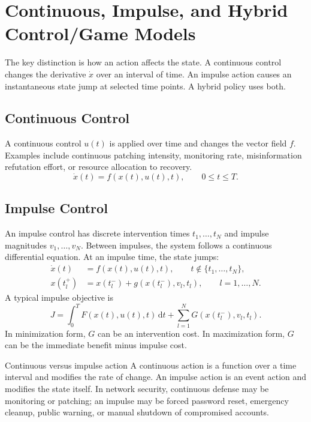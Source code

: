\documentclass[11pt,a4paper]{article}
\newcommand{\dd}{\,\mathrm{d}}
\begin{document}
\section{Continuous, Impulse, and Hybrid Control/Game Models}

The key distinction is how an action affects the state. A continuous control changes the derivative $\dot{x}$ over an interval of time. An impulse action causes an instantaneous state jump at selected time points. A hybrid policy uses both.

\subsection{Continuous Control}

A continuous control $u(t)$ is applied over time and changes the vector field $f$. Examples include continuous patching intensity, monitoring rate, misinformation refutation effort, or resource allocation to recovery.
\begin{equation}
  \dot{x}(t)=f(x(t),u(t),t),\qquad 0\leq t\leq T.
\end{equation}

\subsection{Impulse Control}

An impulse control has discrete intervention times $t_1,\dots,t_N$ and impulse magnitudes $v_1,\dots,v_N$. Between impulses, the system follows a continuous differential equation. At an impulse time, the state jumps:
\begin{align}
  \dot{x}(t)&=f(x(t),u(t),t),\qquad t\notin\{t_1,\dots,t_N\},\label{eq:imp-flow}\\
  x(t_l^+)&=x(t_l^-)+g(x(t_l^-),v_l,t_l),\qquad l=1,
  \dots,N.\label{eq:imp-jump}
\end{align}
A typical impulse objective is
\begin{equation}
  J=\int_0^T F(x(t),u(t),t)\dd t+\sum_{l=1}^N G(x(t_l^-),v_l,t_l).
\end{equation}
In minimization form, $G$ can be an intervention cost. In maximization form, $G$ can be the immediate benefit minus impulse cost.

\begin{definitionbox}{Continuous versus impulse action}
A continuous action is a function over a time interval and modifies the rate of change. An impulse action is an event action and modifies the state itself. In network security, continuous defense may be monitoring or patching; an impulse may be forced password reset, emergency cleanup, public warning, or manual shutdown of compromised accounts.
\end{definitionbox}
\end{document}
